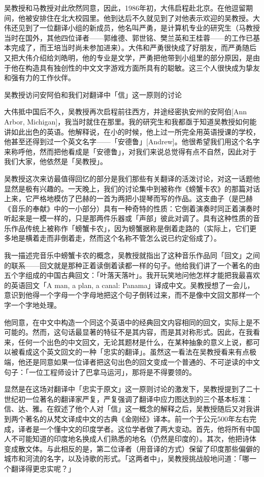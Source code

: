 \documentclass[
  12pt,
  twoside,
  openright,
  oldfontcommands,
]{memoir}
\begin{document}
吴教授和马教授对此欣然同意，因此，1986年初，大伟启程赴北京。在他逗留期间，他被安排住在北大校园里。他到达后不久就见到了对他表示欢迎的吴教授。大伟还见到了一位翻译小组的新成员，他名叫严勇，是计算机专业的研究生（马教授当时在国外，其他四位译者------郭维德、郭世铭、樊兰英和王桂蓉------的工作已基本完成了，而王培当时尚未参加进来）。大伟和严勇很快成了好朋友，而严勇随后又把大伟介绍给刘皓明，他的专业是文学，严勇把他带到小组里的部分原因，是由于他在构造具有独创性的中文文字游戏方面所具有的聪敏。这三个人很快成为挚友和强有力的工作伙伴。

{吴教授访}问安阿伯和我们对翻译中「信」这一原则的讨论

大伟抵中国后不久，吴教授再次启程前往西方，并途经密执安州的安阿伯{[}Ann
Arbor,
Michigan{]}，我当时就住在那里。我的研究生和我都亟于知道吴教授如何能讲如此出色的英语。他解释说，在小的时候，他上过一所完全用英语授课的学校，他甚至还得到过一个英文名字------「安德鲁」{[}Andrew{]}。他很希望我们用这个名字来称呼他，然而把他看成是「安德鲁」，对我们来说总觉得有点不自然，因此对于我们大家，他依然是「吴教授」。

吴教授这次来访最值得回忆的部分是我们那些有关翻译的活泼讨论，对这一话题他显然是极有兴趣的。一天晚上，我们的讨论集中到被称作《螃蟹卡农》的那篇对话上来，它严格地模仿了巴赫的一首为两把小提琴而写的作品。这支曲子（是巴赫《音乐的奉献》中的一小部分）具有一种奇特的性质：它倒着演奏时同正着演奏时听起来是一模一样的，只是那两件乐器或「声部」彼此对调了。具有这种性质的音乐作品传统上被称作「螃蟹卡农」，因为螃蟹据称是倒着走路的（实际上，它们更多地是横着走而非倒着走，然而这个名称不管怎么说已约定俗成了）。

我一描述完音乐中螃蟹卡农的概念，吴教授就指出了这种音乐作品同「回文」之间的联系------回文就是那种正着读倒着读都一样的句子。他给我们讲了一个著名的由五个字组成的中国古典回文：「叶落天落叶」。我开玩笑地问他怎样才能把我最喜欢的英语回文「A
man, a plan, a canal:
Panama」译成中文。吴教授想了一会儿，意识到他得一个字母一个字母地把这个句子倒转过来，而不是像中文回文那样一个字一个字地处理。

他同意，在中文中构造一个同这个英语中的经典回文内容相同的回文，实际上是不可能的。然而，这句话最显著的特征不是其内容，而是其对称形式。因此，在我看来，任何一个出色的中文回文，无论其题材是什么，在某种抽象的意义上说，都可以被看成这个英文回文的一种「忠实的翻译」。虽然这一看法在吴教授看来有点极端，他还是同意如果一位译者把这句出色的回文变成一个普通的、不可逆读的中文句子：「一位工程师设计了巴拿马运河」，那将是不得要领的。

显然是在这场对翻译中「忠实于原文」这一原则讨论的激发下，吴教授提到了二十世纪初一位著名的翻译家严复，严复强调了翻译中应力图达到的三个基本标准：信、达、雅。在叙述了他个人对「信」这一概念的解释之后，吴教授随后又对我讲到两个著名的从梵文译成中文的古典《金刚经》译本。前一个于公元500年左右完成，译者是一个懂中文的印度学者。这位学者做了两大变动。首先，他将所有中国人不可能知道的印度地名换成人们熟悉的地名（仍然是印度的）。其次，他把诗体变成散文体。与此相反的是，第二位译者（用音译的方式）保留了印度那些偏僻的城市和河流的名字，以及诗歌的形式。「这两者中」，吴教授挑战般地问道：「哪一个翻译得更忠实呢？」
\end{document}
